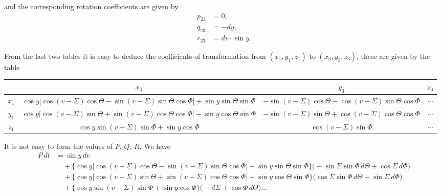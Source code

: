 \documentclass[12pt,a4paper]{article}
\theoremstyle{plain}
\begin{document}
\noindent and the corresponding rotation coefficients are given by
\begin{align*}
p_{23} &= 0,\\
q_{23} &= -dy,\\
r_{23} &= dv\cdot\sin y.
\end{align*}

\medskip
From the last two tables it is easy to deduce the coefficients of transformation from $(x_{1},y_{1},z_{1})$ to $(x_{3},y_{3},z_{3})$, these are given by the table

\begin{center}
\scriptsize
\begin{tabular}{|c|c|c|c|}
\hline
       & $x_{3}$ & $y_{3}$ & $z_{3}$ \\
\hline
$x_{1}$ & $\cos y\bigl[\cos(v-\varSigma)\cos\Theta-\sin(v-\varSigma)\sin\Theta\cos\varPhi\bigr]+\sin y\sin\Theta\sin\varPhi$ & $-\sin(v-\varSigma)\cos\Theta-\cos(v-\varSigma)\sin\Theta\cos\varPhi$ & $\cdots$ \\
$y_{1}$ & $\cos y\bigl[\cos(v-\varSigma)\sin\Theta+\sin(v-\varSigma)\cos\Theta\cos\varPhi\bigr]-\sin y\cos\Theta\sin\varPhi$ & $-\sin(v-\varSigma)\sin\Theta+\cos(v-\varSigma)\cos\Theta\cos\varPhi$ & $\cdots$ \\
$z_{1}$ & $\cos y\sin(v-\varSigma)\sin\varPhi+\sin y\cos\varPhi$ & $\cos(v-\varSigma)\sin\varPhi$ & $\cdots$ \\
\hline
\end{tabular}
\end{center}

\noindent It is not easy to form the values of $P$, $Q$, $R$. We have
\begin{align*}
P\,dt &= \sin y\,dv\\
&\quad +\bigl\{\cos y\bigl[\cos(v-\varSigma)\cos\Theta-\sin(v-\varSigma)\sin\Theta\cos\varPhi\bigr]+\sin y\sin\Theta\sin\varPhi\bigr\}\bigl(-\sin\varSigma\sin\varPhi\,d\Theta+\cos\varSigma\,d\varPhi\bigr)\\
&\quad +\bigl\{\cos y\bigl[\cos(v-\varSigma)\sin\Theta+\sin(v-\varSigma)\cos\Theta\cos\varPhi\bigr]-\sin y\cos\Theta\sin\varPhi\bigr\}\bigl(\cos\varSigma\sin\varPhi\,d\Theta+\sin\varSigma\,d\varPhi\bigr)\\
&\quad +\bigl\{\cos y\sin(v-\varSigma)\sin\varPhi+\sin y\cos\varPhi\bigr\}\bigl(-d\varSigma+\cos\varPhi\,d\Theta\bigr)\ldots
\end{align*}
\end{document}
